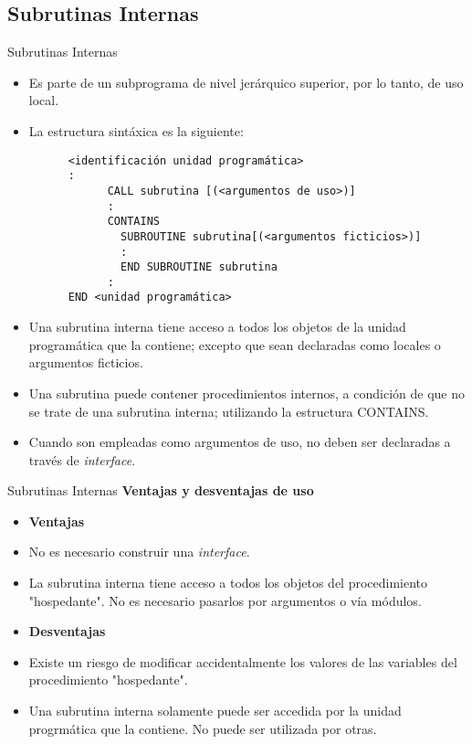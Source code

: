 \subsection{Subrutinas Internas}

\begin{frame}[fragile]{Subrutinas Internas}
 \begin{itemize}[<+(0)->]
  \item Es parte de un subprograma de nivel jerárquico superior, por lo tanto, de uso local.
  \item La estructura sintáxica es la siguiente:
   \vspace{0.15cm}
      \begin{verbatim}
      <identificación unidad programática>
      :
            CALL subrutina [(<argumentos de uso>)]
            :
            CONTAINS
              SUBROUTINE subrutina[(<argumentos ficticios>)]
              :
              END SUBROUTINE subrutina
            :
      END <unidad programática>
      \end{verbatim}
  \item Una subrutina interna tiene acceso a todos los objetos de la unidad programática que la contiene; excepto que sean declaradas como locales o argumentos ficticios.
  \item Una subrutina puede contener procedimientos internos, a condición de que no se trate de una subrutina interna; utilizando la estructura CONTAINS.
  \item Cuando son empleadas como argumentos de uso, no deben ser declaradas a través de \emph{interface}.
 \end{itemize}
\end{frame}

\begin{frame}[fragile]{Subrutinas Internas}
 \textbf{Ventajas y desventajas de uso}
  \begin{itemize}[<+(0)->]
   \item [] \textbf{Ventajas}
   \item No es necesario construir una \emph{interface}.
   \item La subrutina interna tiene acceso a todos los objetos del procedimiento "hospedante". No es necesario pasarlos por argumentos o vía módulos.
   \item [] \textbf{Desventajas}
   \item Existe un riesgo de modificar accidentalmente los valores de las variables del procedimiento "hospedante".
   \item Una subrutina interna solamente puede ser accedida por la unidad progrmática que la contiene. No puede ser utilizada por otras.
 \end{itemize}
\end{frame}


